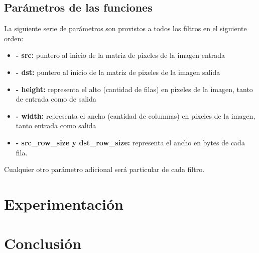 \documentclass[a4paper]{article}
\begin{document}
\subsection{Parámetros de las funciones}
La siguiente serie de parámetros son provistos a todos los filtros en el siguiente orden:
\begin{itemize}
    \item \textbf{- src:} puntero al inicio de la matriz de pixeles de la imagen entrada
    \item \textbf{- dst:} puntero al inicio de la matriz de pixeles de la imagen salida
    \item \textbf{- height:} representa el alto (cantidad de filas) en pixeles de la imagen, tanto de entrada como de salida
    \item \textbf{- width:} representa el ancho (cantidad de columnas) en pixeles de la imagen, tanto entrada como salida
    \item \textbf{- src_row_size y dst_row_size:} representa el ancho en bytes de cada fila.
\end{itemize}
 Cualquier otro parámetro adicional será particular de cada filtro.







\section{Experimentación}

\newpage
\section{Conclusión}
\end{document}
